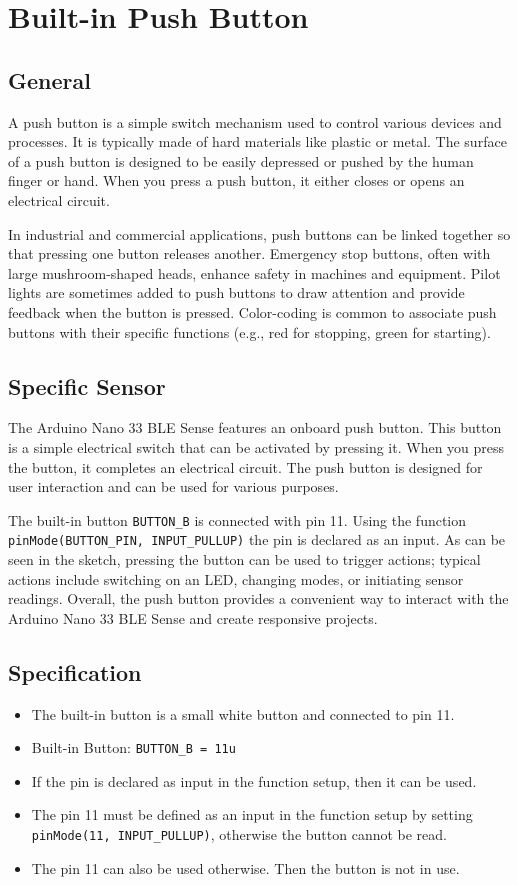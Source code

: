 
	
	\section{Built-in Push Button}
	
	\subsection{General}
	A push button is a simple switch mechanism used to control various devices and processes. It is typically made of hard materials like plastic or metal. The surface of a push button is designed to be easily depressed or pushed by the human finger or hand. When you press a push button, it either closes or opens an electrical circuit.
	
	In industrial and commercial applications, push buttons can be linked together so that pressing one button releases another. Emergency stop buttons, often with large mushroom-shaped heads, enhance safety in machines and equipment. Pilot lights are sometimes added to push buttons to draw attention and provide feedback when the button is pressed. Color-coding is common to associate push buttons with their specific functions (e.g., red for stopping, green for starting).
	
	\subsection{Specific Sensor}
	The Arduino Nano 33 BLE Sense features an onboard push button. This button is a simple electrical switch that can be activated by pressing it. When you press the button, it completes an electrical circuit. The push button is designed for user interaction and can be used for various purposes.
	
	The built-in button \texttt{BUTTON\_B} is connected with pin 11. Using the function \texttt{pinMode(BUTTON\_PIN, INPUT\_PULLUP)} the pin is declared as an input. As can be seen in the sketch, pressing the button can be used to trigger actions; typical actions include switching on an LED, changing modes, or initiating sensor readings. Overall, the push button provides a convenient way to interact with the Arduino Nano 33 BLE Sense and create responsive projects.
	
	\subsection{Specification}
	\begin{itemize}
		\item The built-in button is a small white button and connected to pin 11.
		\item Built-in Button: \texttt{BUTTON\_B = 11u}
		\item If the pin is declared as input in the function setup, then it can be used.
		\item The pin 11 must be defined as an input in the function setup by setting \texttt{pinMode(11, INPUT\_PULLUP)}, otherwise the button cannot be read.
		\item The pin 11 can also be used otherwise. Then the button is not in use.
	\end{itemize}
	
